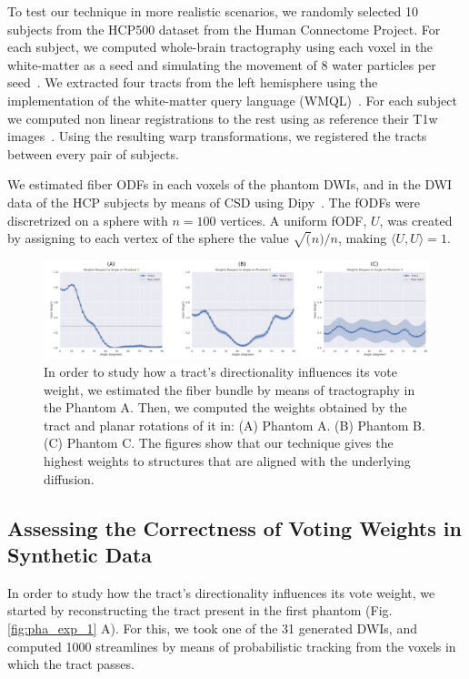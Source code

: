 To test our technique in more realistic scenarios, we randomly selected 10 subjects
from the HCP500 dataset from the Human Connectome Project. For each subject,
we computed whole-brain tractography using each voxel in the white-matter as
a seed and simulating the movement of 8 water particles per seed~\cite{Garyfallidis2014}.
We extracted four tracts from the left hemisphere using
the implementation of the white-matter query language (WMQL)~\cite{Wassermann2016}.
For each subject we computed non linear registrations to the rest using as
reference their T1w images~\cite{Jenkinson2012}. Using the resulting warp
transformations, we registered the tracts between every pair of subjects.

We estimated fiber ODFs in each voxels of the phantom DWIs, and in the DWI data
of the HCP subjects by means of CSD using Dipy~\cite{Garyfallidis2014}. The fODFs were
discretrized on a sphere with $n=100$ vertices. A uniform fODF, $U$, was created
by assigning to each vertex of the sphere the value $\sqrt(n)/n$, making $\langle U, U\rangle = 1$.

\begin{figure}[t]
    \includegraphics[width=\textwidth]{7.multiatlas/img/weights.png}
    \caption{In order to study how a tract's directionality influences its vote weight,
             we estimated the fiber bundle by means of tractography in the Phantom A.
             Then, we computed the weights obtained by the tract and planar rotations of
             it in: (A) Phantom A. (B) Phantom B. (C) Phantom C. The figures show that
             our technique gives the highest weights to structures that are aligned
             with the underlying diffusion.}
    \label{fig:weights}
\end{figure} 

\subsection{Assessing the Correctness of Voting Weights in Synthetic Data}
In order to study how the tract's directionality influences its vote weight,
we started by reconstructing the tract present in the first phantom (Fig. \ref{fig:pha_exp_1} A).
For this, we took one of the 31 generated DWIs, and computed 1000 streamlines by
means of probabilistic tracking from the voxels in which the tract passes.

